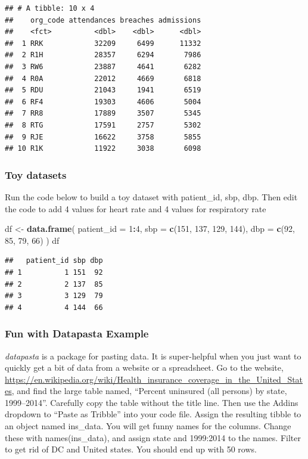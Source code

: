 \documentclass[
]{book}
\newenvironment{Shaded}{\begin{snugshade}}{\end{snugshade}}
\newcommand{\DataTypeTok}[1]{\textcolor[rgb]{0.13,0.29,0.53}{#1}}
\newcommand{\DecValTok}[1]{\textcolor[rgb]{0.00,0.00,0.81}{#1}}
\newcommand{\KeywordTok}[1]{\textcolor[rgb]{0.13,0.29,0.53}{\textbf{#1}}}
\newcommand{\NormalTok}[1]{#1}
\newcommand{\OperatorTok}[1]{\textcolor[rgb]{0.81,0.36,0.00}{\textbf{#1}}}
\newcommand{\StringTok}[1]{\textcolor[rgb]{0.31,0.60,0.02}{#1}}
\begin{document}
\begin{verbatim}
## # A tibble: 10 x 4
##    org_code attendances breaches admissions
##    <fct>          <dbl>    <dbl>      <dbl>
##  1 RRK            32209     6499      11332
##  2 R1H            28357     6294       7986
##  3 RW6            23887     4641       6282
##  4 R0A            22012     4669       6818
##  5 RDU            21043     1941       6519
##  6 RF4            19303     4606       5004
##  7 RR8            17889     3507       5345
##  8 RTG            17591     2757       5302
##  9 RJE            16622     3758       5855
## 10 R1K            11922     3038       6098
\end{verbatim}

\hypertarget{toy-datasets}{%
\subsubsection{Toy datasets}\label{toy-datasets}}

Run the code below to build a toy dataset with patient\_id, sbp, dbp.
Then edit the code to add 4 values for heart rate and
4 values for respiratory rate

\begin{Shaded}
\begin{Highlighting}[]
\NormalTok{df <-}\StringTok{ }\KeywordTok{data.frame}\NormalTok{(}
  \DataTypeTok{patient_id =} \DecValTok{1}\OperatorTok{:}\DecValTok{4}\NormalTok{,}
  \DataTypeTok{sbp =} \KeywordTok{c}\NormalTok{(}\DecValTok{151}\NormalTok{, }\DecValTok{137}\NormalTok{, }\DecValTok{129}\NormalTok{, }\DecValTok{144}\NormalTok{),}
  \DataTypeTok{dbp =} \KeywordTok{c}\NormalTok{(}\DecValTok{92}\NormalTok{, }\DecValTok{85}\NormalTok{, }\DecValTok{79}\NormalTok{, }\DecValTok{66}\NormalTok{)}
\NormalTok{)}
\NormalTok{df}
\end{Highlighting}
\end{Shaded}

\begin{verbatim}
##   patient_id sbp dbp
## 1          1 151  92
## 2          2 137  85
## 3          3 129  79
## 4          4 144  66
\end{verbatim}

\hypertarget{fun-with-datapasta-example}{%
\subsubsection{Fun with Datapasta Example}\label{fun-with-datapasta-example}}

\emph{datapasta} is a package for pasting data. It is super-helpful when you just want to quickly get a bit of data from a website or a spreadsheet.
Go to the website, \url{https://en.wikipedia.org/wiki/Health_insurance_coverage_in_the_United_States}, and find the large table named, ``Percent uninsured (all persons) by state, 1999--2014''. Carefully copy the table without the title line.
Then use the Addins dropdown to ``Paste as Tribble'' into your code file. Assign the resulting tibble to an object named ins\_data. You will get funny names for the columns. Change these with names(ins\_data), and assign state and 1999:2014 to the names.
Filter to get rid of DC and United states. You should end up with 50 rows.
\end{document}
